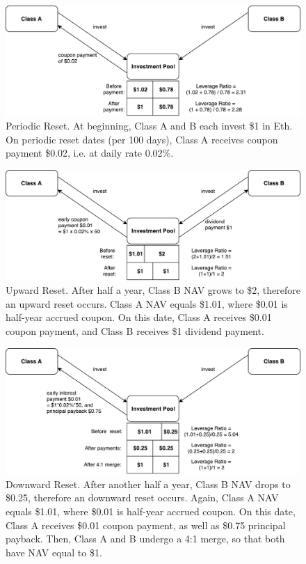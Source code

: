\documentclass[10pt]{amsart}
\begin{document}
\begin{figure}
\includegraphics[width=\textwidth]{periodic.pdf}
\caption{Periodic Reset. At beginning, Class A and B each invest \$1 in Eth. On periodic reset dates (per 100 days), Class A receives coupon payment \$0.02, i.e. at daily rate 0.02\%.}
\end{figure}

\begin{figure}
\includegraphics[width=\textwidth]{upward.pdf}
\caption{Upward Reset. After half a year, Class B NAV grows to \$2, therefore an upward reset occurs. Class A NAV equals \$1.01, where \$0.01 is half-year accrued coupon. On this date, Class A receives \$0.01 coupon payment, and Class B receives \$1 dividend payment.}
\end{figure}

\begin{figure}
\includegraphics[width=\textwidth]{downward.pdf}
\caption{Downward Reset. After another half a year, Class B NAV drops to \$0.25, therefore an downward reset occurs. Again, Class A NAV equals \$1.01, where \$0.01 is half-year accrued coupon. On this date, Class A receives \$0.01 coupon payment, as well as \$0.75 principal payback. Then, Class A and B undergo a 4:1 merge, so that both have NAV equal to \$1.}
\end{figure}
\end{document}
